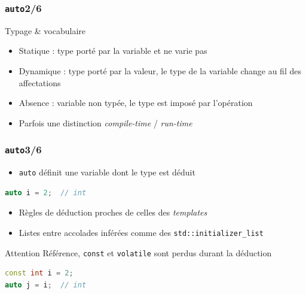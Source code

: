 \documentclass[C++.tex]{subfiles}
\begin{document}
\begin{frame}[fragile]
	\frametitle{\lstinline|auto|\titlehfill{}2/6}
	\begin{block}{Typage \& vocabulaire}
		\begin{itemize}
			\item Statique : type porté par la variable et ne varie pas
			\item Dynamique : type porté par la valeur, le type de la variable change au fil des affectations
			\item Absence : variable non typée, le type est imposé par l'opération
			\item Parfois une distinction \textit{compile-time} / \textit{run-time}

		\end{itemize}
	\end{block}
\end{frame}

\begin{frame}[fragile]
	\frametitle{\lstinline|auto|\titlehfill{}3/6}
	\begin{itemize}
		\item \lstinline|auto| définit une variable dont le type est déduit
	\end{itemize}

	\begin{lstlisting}[language=C++]
auto i = 2;  // int\end{lstlisting}

	\begin{itemize}
		\item Règles de déduction proches de celles des \textit{templates}
		\item Listes entre accolades inférées comme des \lstinline|std::initializer_list|
	\end{itemize}

	\begin{alertblock}{Attention}
		Référence, \lstinline|const| et \lstinline|volatile| sont perdus durant la déduction

		\begin{lstlisting}[language=C++]
const int i = 2;
auto j = i;  // int \end{lstlisting}
	\end{alertblock}
\end{frame}
\end{document}
